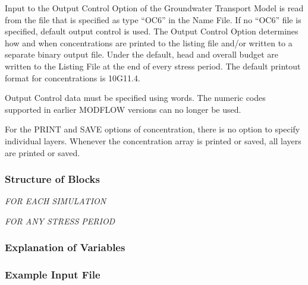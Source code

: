 Input to the Output Control Option of the Groundwater Transport Model is read from the file that is specified as type ``OC6'' in the Name File. If no ``OC6'' file is specified, default output control is used. The Output Control Option determines how and when concentrations are printed to the listing file and/or written to a separate binary output file.  Under the default, head and overall budget are written to the Listing File at the end of every stress period. The default printout format for concentrations is 10G11.4.

Output Control data must be specified using words.  The numeric codes supported in earlier MODFLOW versions can no longer be used.

For the PRINT and SAVE options of concentration, there is no option to specify individual layers.  Whenever the concentration array is printed or saved, all layers are printed or saved.

\vspace{5mm}
\subsubsection{Structure of Blocks}
\vspace{5mm}

\noindent \textit{FOR EACH SIMULATION}

\vspace{5mm}
\noindent \textit{FOR ANY STRESS PERIOD}


\vspace{5mm}
\subsubsection{Explanation of Variables}
\begin{description}

\end{description}

\vspace{5mm}
\subsubsection{Example Input File}

